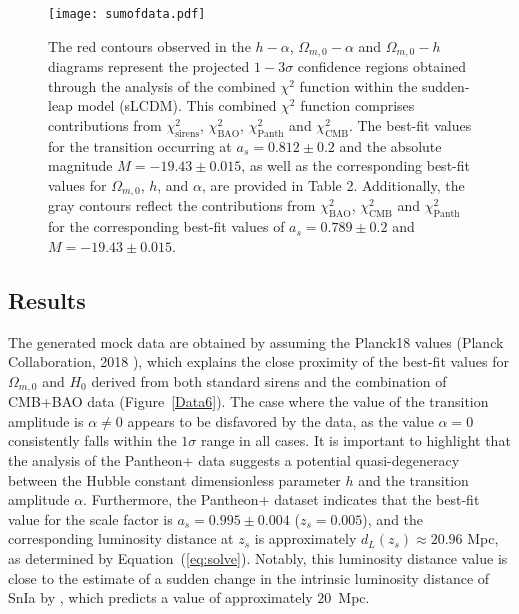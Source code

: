 \documentclass[universe,article,accept,moreauthors,pdftex]{Definitions/mdpi}
\begin{document}
 
     \begin{figure}[H] 
    \texttt{[image: sumofdata.pdf]}
    \caption{The red contours observed in the $h-\alpha$, $\Omega_{m,0}-\alpha$ and $\Omega_{m,0}-h$ diagrams represent the projected $1-3\sigma$ confidence regions obtained through the analysis of the combined $\chi^{2}$ function within the sudden-leap model (sLCDM). This combined $\chi^{2}$ function comprises contributions from $\chi^{2}_{\text{sirens}}$, $\chi^{2}_{\text{BAO}}$, $\chi^{2}_{\text{Panth}}$ and $\chi^{2}_{\text{CMB}}$. The best-fit values for the transition occurring at $a_{s}=0.812\pm 0.2$ and the absolute magnitude $M=-19.43\pm 0.015$, as well as the corresponding best-fit values for $\Omega_{m,0}$, $h$, and $\alpha$, are provided in Table 2. Additionally, the gray contours reflect the contributions from $\chi^{2}_{\text{BAO}}$, $\chi^{2}_{\text{CMB}}$ and $\chi^{2}_{\text{Panth}}$ for the corresponding best-fit values of $a_{s}=0.789 \pm 0.2$ and $M=-19.43\pm 0.015$. }
    \label{Data11}
\end{figure}






\subsection{Results}\label{subsec:3.5}




The generated mock data are obtained by assuming the Planck18 values (Planck Collaboration, 2018 \cite{Planck:2018vyg}), which explains the close proximity of the best-fit values for $\Omega_{m,0}$ and $H_{0}$ derived from both standard sirens and the combination of CMB+BAO data \mbox{(Figure \ref{Data6}).}
The case where the value of the transition amplitude is  $\alpha\neq 0$ appears to be disfavored by the data, as the value $\alpha=0$ consistently falls within the $1\sigma$ range in all cases. It is important to highlight that the analysis of the Pantheon+ data suggests a potential quasi-degeneracy between the Hubble constant dimensionless parameter $h$ and the transition amplitude  $\alpha$. Furthermore, the Pantheon+ dataset indicates that the best-fit value for the scale factor is $a_s = 0.995\pm0.004$ ($z_s = 0.005$), and the corresponding luminosity distance at $z_s$ is approximately $d_L(z_s)\approx20.96$ Mpc, as determined by \mbox{Equation (\ref{eq:solve})}. Notably, this luminosity distance value is close to the estimate of a sudden change in the intrinsic luminosity distance of SnIa by \cite{Perivolaropoulos:2023tdt,Perivolaropoulos:2023iqj,Alestas:2021nmi,Perivolaropoulos:2021bds}, which predicts a value of approximately \mbox{$20$ Mpc.}
\end{document}
